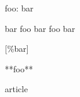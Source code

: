 
\def\mytitle{Variables}
\def\foo{bar foo bar foo bar}
\def\bat{**foo**}


foo: bar

bar foo bar foo bar

[\%bar]

**foo**

article


